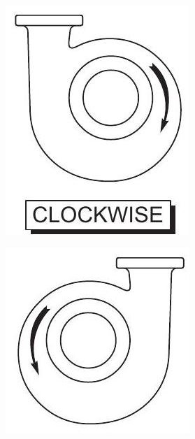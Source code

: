 \documentclass[10pt]{article}
\begin{document}
\includegraphics[max width=\textwidth]{2022_11_03_65aa625ded296bdfd01fg-07}

\includegraphics[max width=\textwidth]{2022_11_03_65aa625ded296bdfd01fg-07(1)}
\end{document}

